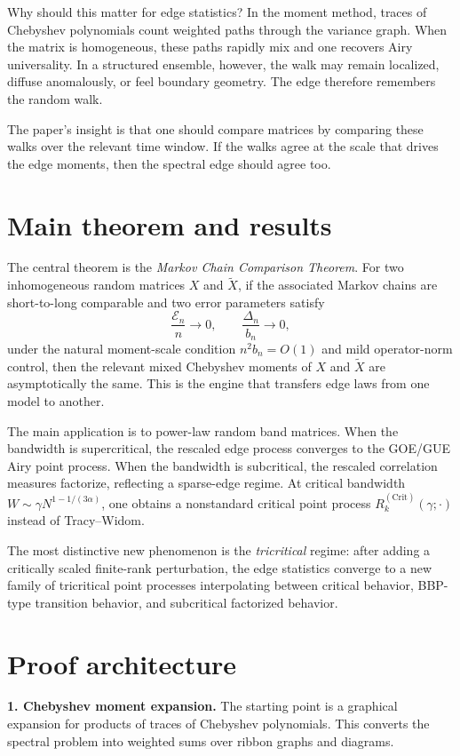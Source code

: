 \documentclass[11pt]{article}
\begin{document}
Why should this matter for edge statistics? In the moment method, traces of Chebyshev polynomials count weighted paths through the variance graph. When the matrix is homogeneous, these paths rapidly mix and one recovers Airy universality. In a structured ensemble, however, the walk may remain localized, diffuse anomalously, or feel boundary geometry. The edge therefore remembers the random walk.

The paper's insight is that one should compare matrices by comparing these walks over the relevant time window. If the walks agree at the scale that drives the edge moments, then the spectral edge should agree too.

\section*{Main theorem and results}
The central theorem is the \emph{Markov Chain Comparison Theorem}. For two inhomogeneous random matrices $X$ and $\widetilde X$, if the associated Markov chains are short-to-long comparable and two error parameters satisfy
\[
\frac{\mathcal E_n}{n}\to 0,\qquad \frac{\Delta_n}{b_n}\to 0,
\]
under the natural moment-scale condition $n^2b_n=O(1)$ and mild operator-norm control, then the relevant mixed Chebyshev moments of $X$ and $\widetilde X$ are asymptotically the same. This is the engine that transfers edge laws from one model to another.

The main application is to power-law random band matrices. When the bandwidth is supercritical, the rescaled edge process converges to the GOE/GUE Airy point process. When the bandwidth is subcritical, the rescaled correlation measures factorize, reflecting a sparse-edge regime. At critical bandwidth $W\sim \gamma N^{1-1/(3\alpha)}$, one obtains a nonstandard critical point process $R_k^{\mathrm{(Crit)}}(\gamma;\cdot)$ instead of Tracy--Widom.

The most distinctive new phenomenon is the \emph{tricritical} regime: after adding a critically scaled finite-rank perturbation, the edge statistics converge to a new family of tricritical point processes interpolating between critical behavior, BBP-type transition behavior, and subcritical factorized behavior.

\section*{Proof architecture}
\textbf{1. Chebyshev moment expansion.} The starting point is a graphical expansion for products of traces of Chebyshev polynomials. This converts the spectral problem into weighted sums over ribbon graphs and diagrams.
\end{document}
